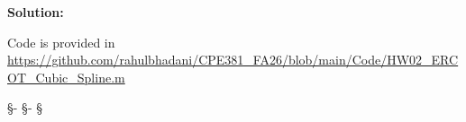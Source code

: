 \documentclass[12pt, xcolor=dvipsnames,svgnames,x11names]{article}
\begin{document}
\textbf{Solution:}

Code is provided in \url{https://github.com/rahulbhadani/CPE381_FA26/blob/main/Code/HW02_ERCOT_Cubic_Spline.m}



\begin{center}
   \S - \S - \S
\end{center}
\end{document}
